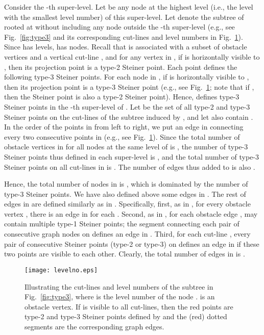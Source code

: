 \documentclass[english,runningheads,11pt]{llncs}
\begin{document}
Consider the -th super-level.
Let  be any node at the highest level (i.e., the level with the smallest level number) of this super-level. Let
 denote the subtree of  rooted at  without including
any node outside the -th super-level (e.g., see Fig.~\ref{fig:type3} and its corresponding cut-lines and level numbers in Fig.~\ref{fig:levelno}). Since  has
 levels,  has
 nodes. Recall that  is associated with a
subset  of obstacle vertices and a vertical cut-line , and for any vertex 
in , if  is horizontally visible to
, then its projection point  is a type-2 Steiner
point. Each point  defines the following type-3 Steiner points. For
each node  in , if  is horizontally visible to
, then its projection point  is a type-3 Steiner
point (e.g., see Fig.~\ref{fig:levelno}; note that if , then the Steiner point is also a type-2 Steiner point).
Hence,  defines  type-3 Steiner
points in the -th super-level of . Let  be the set of all
type-2 and type-3 Steiner points on the cut-lines of the subtree
 induced by , and let  also contain . In the order of the
points in  from left to right, we put an edge in
 connecting every two consecutive points in  (e.g., see Fig.~\ref{fig:levelno}).
Since the total number of obstacle vertices in  for all nodes 
at the same level of  is , the number of type-3
Steiner points thus defined in each super-level is , and the total number of type-3 Steiner points on all cut-lines
in  is . The number of edges
thus added to  is also .


Hence, the total number of nodes in  is , which is dominated by the number of type-3
Steiner points.
We have also defined above some edges in . The rest of
edges in  are defined similarly as in . Specifically,
first, as in , for every obstacle vertex ,
there is an edge  in  for each . Second, as in ,
for each obstacle edge ,  may contain
multiple type-1 Steiner points;
the segment connecting each pair of consecutive graph nodes on  defines an
edge in . Third, for each cut-line , every pair of
consecutive Steiner points (type-2 or type-3)
on  defines an edge in  if
these two points are visible to each other.
Clearly, the total number of edges in  is .


\begin{figure}[t]
\begin{minipage}[t]{\linewidth}
\begin{center}
\texttt{[image: levelno.eps]}
\caption{\footnotesize Illustrating the cut-lines and level numbers of the subtree  in Fig.~\ref{fig:type3}, where  is the level number  of the node .  is an obstacle vertex. If  is visible to all cut-lines, then the red points are type-2 and type-3 Steiner points defined by  and the (red) dotted segments are the corresponding graph edges. }
\label{fig:levelno}
\end{center}
\end{minipage}
\vspace*{-0.15in}
\end{figure}
\end{document}
